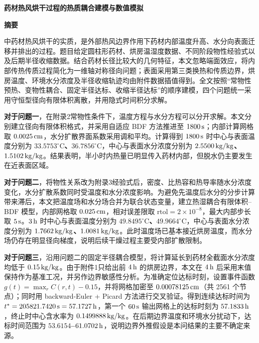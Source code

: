 \documentclass[UTF8,a4paper,12pt]{ctexart}
\numberwithin{equation}{section}
\begin{document}
\begin{center}
  {\fontsize{14pt}{18pt}\selectfont\bfseries 药材热风烘干过程的热质耦合建模与数值模拟}\par\vspace{10pt}
  {\fontsize{14pt}{18pt}\selectfont\bfseries 摘要}
\end{center}

中药材热风烘干的实质，是外部热风边界作用下药材内部温度升高、水分向表面迁移并排出的过程。题目给定圆柱形药材、烘房温湿度数据、不同阶段物性经验式以及后期半径收缩数据。结合药材长径比较大的几何特征，本文忽略端面效应，将内部传热传质过程简化为一维轴对称径向问题；表面采用第三类换热和传质边界，烘房温度、环境水分浓度及半径收缩轨迹均由附件数据插值得到。全文按照“常物性预热、变物性耦合、固定半径达标、收缩半径达标”的顺序建模，四个问题统一采用守恒型径向有限体积离散，并用隐式时间积分求解。

\textbf{对于问题一}，在附录2常物性条件下，温度方程与水分方程可以分开求解。本文分别建立径向有限体积格式，并采用自适应 BDF 方法推进至 $1800\rm\,s$；内部计算网格取 $0.0025\rm\,cm$，水分扩散界面系数采用调和平均。计算得到 $1800\rm\,s$ 时中心与表面温度分别为 \textbf{$33.5753^\circ\mathrm C$、$36.7856^\circ\mathrm C$}，中心与表面水分浓度分别为 \textbf{$2.5500\rm\,kg/kg$、$1.5102\rm\,kg/kg$}。结果表明，半小时内热量已明显传入药材内部，但脱水仍主要发生在近表面区域。

\textbf{对于问题二}，将物性关系改为附录3经验式后，密度、比热容和热导率随水分浓度变化，水分扩散系数同时受温度和水分浓度影响。为避免先温度后水分的分步计算带来滞后，本文把温度场和水分场合并为联合状态变量，建立热湿耦合有限体积--BDF 模型，内部网格取 $0.025\rm\,cm$，相对误差限取 $\mathrm{rtol}=2\times10^{-8}$，最大内部步长取 $5\rm\,s$。$3\rm\,h$ 时中心与表面温度分别为 \textbf{$49.8495^\circ\mathrm C$、$49.9664^\circ\mathrm C$}，中心与表面水分浓度分别为 \textbf{$1.7662\rm\,kg/kg$、$1.0081\rm\,kg/kg$}。此时温度场已基本接近烘房温度，而水分场仍存在明显径向梯度，说明后续干燥过程主要受内部扩散限制。

\textbf{对于问题三}，沿用问题二的固定半径耦合模型，将计算延长到药材全截面水分浓度均低于 $0.15\rm\,kg/kg$。由于附件1只给出前 $4\rm\,h$ 的烘房边界，本文在 $4\rm\,h$ 后采用末值保持作为基准工况，并另作边界敏感性分析。为准确定位达标时刻，设置事件函数 $g(t)=\max_r C(r,t)-0.15$，并将网格加密至 $0.00078125\rm\,cm$（共 2561 个节点）；同时用 backward-Euler + Picard 方法进行交叉验证。得到连续达标时间为 \textbf{$t^*=205821.7420\rm\,s=57.1727\rm\,h$}，第一个 $60\rm\,s$ 输出网格上的达标时刻为 \textbf{$57.1833\rm\,h$}，终止时中心含水率为 \textbf{$0.1499888\rm\,kg/kg$}。在后期边界温度和环境水分扰动下，达标时间范围为 \textbf{$53.6154$--$61.0702\rm\,h$}，说明边界外推假设是本问结果的主要不确定来源。
\end{document}
